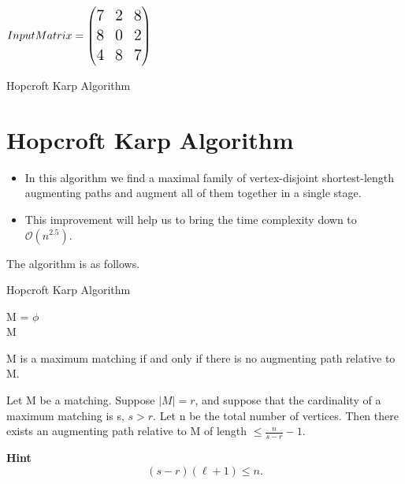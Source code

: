 \documentclass[11pt]{beamer}
\theoremstyle{definition}
\begin{document}
\begin{frame}
$\Large{Input Matrix}=
\begin{pmatrix}
7 & 2 & 8\\
8 & 0 & 2\\
4 & 8 & 7
\end{pmatrix}$
\end{frame}

\begin{frame}
\begin{center}
\huge{Hopcroft Karp Algorithm}
\end{center}
\end{frame}

\section{Hopcroft Karp Algorithm}
\begin{algorithm}[H]%
\begin{itemize}


\item In this algorithm we find a maximal family of vertex-disjoint shortest-length augmenting paths and augment all of them together in a single stage.
\item This improvement will help us to
bring the time complexity down to $\mathcal{O}(n ^{2.5} )$.
\end{itemize}
The algorithm is as follows.
\caption{Hopcroft Karp Algorithm}
M = $\phi$\\
\Return M

\end{algorithm}



\begin{frame}
\begin{theorem}\label{name}
M is a maximum matching if and only if there is no augmenting path relative to M.
\end{theorem}


\begin{theorem}\label{upprbndlenpath}
Let M be a matching. Suppose $|M|= r$, and suppose that the cardinality of a maximum matching is s, $s > r$. Let n be the total number of vertices. Then there exists an augmenting path
relative to M of length $\leq \frac{n}{s-r}-1$.
\end{theorem} 
\textbf{Hint}  $$(s-r)(\ell +1) \leq n.$$
\end{frame}
\end{document}
